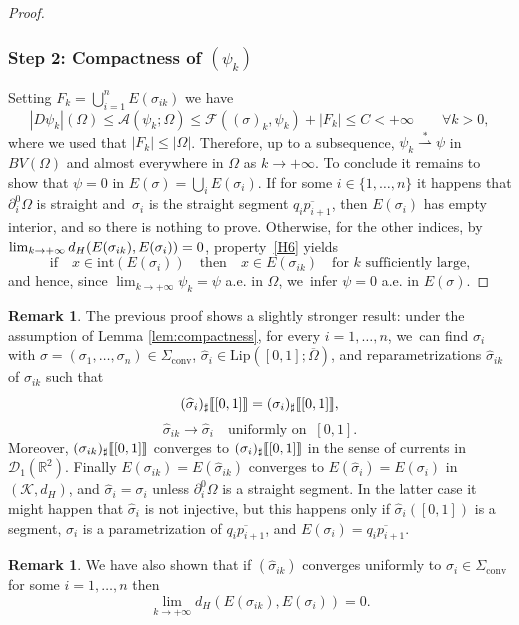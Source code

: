 \documentclass[JEP,XML,SOM,Unicode, NoFloatCountersInSection,published]{cedram}
\newcommand{\R}{\mathbb{R}}
\let\curves\Sigma
\let\Om\Omega
\newcommand{\weakstar}{\stackrel{*}{\rightharpoonup}}
\newcommand\convexcurves{\curves_\mathrm{conv}}
\newcommand{\jump}[1]{\textup{\textlbrackdbl}{#1}\textup{\textrbrackdbl}}
\newcommand{\Lip}{\mathrm{Lip}}
\theoremstyle{definition}
\newtheorem{remark}[theorem]{Remark}
\begin{document}
\begin{proof}
\subsubsection*{Step 2: Compactness of $(\psi_k)$}
Setting $F_k=\bigcup_{i=1}^nE(\sigma_{ik})$ we have
\begin{equation*}
|D\psi_k|(\Om)\le \mathcal{A}(\psi_k;\Om)\le \mathcal{F}((\sigma)_k,\psi_k)+|F_k|\le C<+\infty \qquad \forall k>0,
\end{equation*}
where we used that $|F_k|\le |\Om|$. Therefore,
up to a subsequence, $\psi_k\weakstar\psi$ in $BV(\Om)$ and almost everywhere in $\Om$ as $k \to +\infty$.
To conclude it remains to show that \hbox{$\psi=0$} in $E(\sigma)=\bigcup_iE(\sigma_{i})$. If for some $i\in \{1,\dots,n\}$ it happens that $\partial_i^0\Om$ is straight and~$\sigma_i$ is the straight segment $\overline{q_{i}p_{i+1}}$, then $E(\sigma_i)$ has empty interior, and so there is nothing to prove. Otherwise, for the other indices, by $\lim_{k \to +\infty}d_H(E(\sigma_{ik}),E(\sigma_i))=\nobreak0$,
property~\ref{H6} yields
\begin{equation*}
\text{if}\quad x\in \text{int}(E(\sigma_i)) \quad \text{then}\quad x\in E(\sigma_{ik})\quad\text{for $k$ sufficiently large,}
\end{equation*}
and hence, since $\lim_{k\to +\infty} \psi_k= \psi$ a.e. in $\Om$, we~infer $\psi=0$ a.e. in $ E(\sigma)$.
\end{proof}

\begin{remark}\label{remark_uniform}
The previous proof shows a slightly stronger result: under the assumption of Lemma \ref{lem:compactness},
for every $i=1,\dots,n$, we~can find $\sigma_i$ with $\sigma=
(\sigma_1,\dots,\sigma_n)\in \Sigma_\mathrm{conv}$, $\widehat \sigma_i\in\Lip([0,1];\overline\Om)$, and
reparametrizations $\widehat\sigma_{ik}$ of $\sigma_{ik}$ such that
\[
(\widehat \sigma_i)_\sharp\jump{[0,1]}=(\sigma_i)_\sharp\jump{[0,1]},
\]
\[
\widehat\sigma_{ik}\to\widehat \sigma_i\quad\text{uniformly on }\ [0,1].
\]
Moreover, $( \sigma_{ik})_\sharp\jump{[0,1]}$ converges to $( \sigma_i)_\sharp\jump{[0,1]}$ in the sense of currents in $\mathcal D_1(\R^2)$.
Finally $E(\sigma_{ik})=E(\widehat\sigma_{ik})$ converges to $ E(\widehat \sigma_i)= E( \sigma_i)$ in $(\mathcal K,d_H)$, and $\widehat \sigma_i=\sigma_i$ unless $\partial_i^0\Om$ is a straight segment. In the latter case it might happen that $\widehat \sigma_i$ is not injective, but this
happens only if $\widehat \sigma_i([0,1])$ is a segment, $\sigma_i$ is a parametrization of $\overline{q_ip_{i+1}}$, and $E(\sigma_i)=\overline{q_ip_{i+1}}$.
\end{remark}
\begin{remark}\label{rem:conv}
We have also shown that if $(\widehat\sigma_{ik})$ converges uniformly to $\sigma_i\in\convexcurves$ for some $i=1,\dots,n$ then
\[
\lim_{k \to +\infty}
d_H(E(\sigma_{ik}),E(\sigma_i))= 0.
\]
\end{remark}
\end{document}
